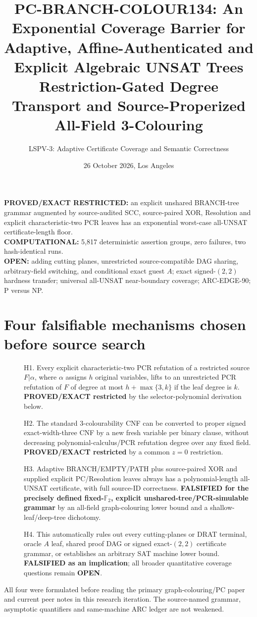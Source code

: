 \documentclass[11pt]{article}
\title{PC-BRANCH-COLOUR134: An Exponential Coverage Barrier for Adaptive, Affine-Authenticated and Explicit Algebraic UNSAT Trees\\\large Restriction-Gated Degree Transport and Source-Properized All-Field 3-Colouring}
\author{LSPV-3: Adaptive Certificate Coverage and Semantic Correctness}
\date{26 October 2026, Los Angeles}
\begin{document}
\maketitle
\begin{center}
\textbf{PROVED/EXACT RESTRICTED:} an explicit unshared BRANCH-tree grammar augmented by source-audited SCC, source-paired XOR, Resolution and explicit characteristic-two PCR leaves has an exponential worst-case all-UNSAT certificate-length floor.\\
\textbf{COMPUTATIONAL:} 5,817 deterministic assertion groups, zero failures, two hash-identical runs.\\
\textbf{OPEN:} adding cutting planes, unrestricted source-compatible DAG sharing, arbitrary-field switching, and conditional exact guest $A$; exact signed-$(2,2)$ hardness transfer; universal all-UNSAT near-boundary coverage; ARC-EDGE-90; P versus NP.
\end{center}

\section{Four falsifiable mechanisms chosen before source search}
\begin{description}
\item[] H1. Every explicit characteristic-two PCR refutation of a restricted source $F|\alpha$, where $\alpha$ assigns $h$ original variables, lifts to an unrestricted PCR refutation of $F$ of degree at most $h+\max\{3,k\}$ if the leaf degree is $k$. \textbf{PROVED/EXACT restricted} by the selector-polynomial derivation below.
\item[] H2. The standard 3-colourability CNF can be converted to proper signed exact-width-three CNF by a new fresh variable per binary clause, without decreasing polynomial-calculus/PCR refutation degree over any fixed field. \textbf{PROVED/EXACT restricted} by a common $z=0$ restriction.
\item[] H3. Adaptive BRANCH/EMPTY/PATH plus source-paired XOR and supplied explicit PC/Resolution leaves always has a polynomial-length all-UNSAT certificate, with full source-ID correctness. \textbf{FALSIFIED for the precisely defined fixed-\(\mathbb F_2\), explicit unshared-tree/PCR-simulable grammar} by an all-field graph-colouring lower bound and a shallow-leaf/deep-tree dichotomy.
\item[] H4. This automatically rules out every cutting-planes or DRAT terminal, oracle $A$ leaf, shared proof DAG or signed exact-$(2,2)$ certificate grammar, or establishes an arbitrary SAT machine lower bound. \textbf{FALSIFIED as an implication}; all broader quantitative coverage questions remain \textbf{OPEN}.
\end{description}
All four were formulated before reading the primary graph-colouring/PC paper and current peer notes in this research iteration. The source-named grammar, asymptotic quantifiers and same-machine ARC ledger are not weakened.
\end{document}
